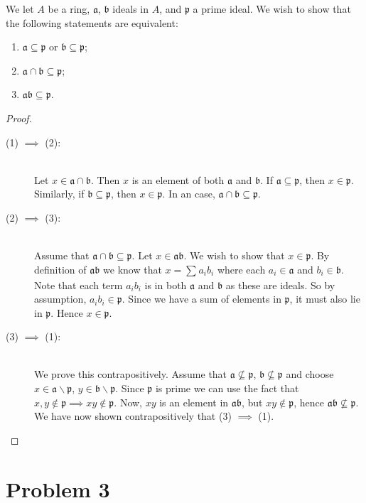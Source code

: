 \documentclass{article}
\newcommand{\p}{\mathfrak{p}}
\renewcommand{\a}{\mathfrak{a}}
\renewcommand{\b}{\mathfrak{b}}
\begin{document}
    We let $A$ be a ring, $\mathfrak{a}$, $\mathfrak{b}$ ideals in $A$, and
    $\mathfrak{p}$ a prime ideal. We wish to show that the following statements
    are equivalent:
    \begin{enumerate}[(1)]
        \item $\a \subseteq \p$ or $\b \subseteq \p$;
        \item $\a \cap \b \subseteq \p$;
        \item $\a\b \subseteq \p$.
    \end{enumerate}
    \begin{proof} 
        \hfill
        \begin{description}
            \item[(1) $\implies$ (2):]\hfill  \\
                Let $x \in \a\cap\b$.
                Then $x$ is an element of both $\mathfrak{a}$ and
                $\b$. If $\a \subseteq \p$, then
                $x \in \p$. Similarly, if $\b \subseteq
                \p$, then $x \in \p$. In an case,
                $\a\cap\b \subseteq \p$.
            \item[(2) $\implies$ (3):]\hfill \\
                Assume that $\a \cap \b \subseteq \p$. Let $x \in \a\b$. We
                wish to show that $x \in \p$. By definition of $\a\b$ we know
                that $x = \sum^{}_{} a_ib_i$ where each $a_i \in \a$ and $b_i
                \in \b$. Note that each term $a_ib_i$ is in both $\a$ and $\b$
                as these are ideals. So by assumption, $a_ib_i \in \p$. Since
                we have a sum of elements in $\p$, it must also lie in $\p$.
                Hence $x \in \p$.
            \item[(3) $\implies$ (1):]\hfill \\
                We prove this contrapositively. Assume that $\a \not\subseteq
                \p$, $\b \not\subseteq \p$ and choose $x \in \a \smallsetminus
                \p$, $y \in \b \smallsetminus \p$. Since $\p$ is prime we can
                use the fact that $x, y \notin \p \implies xy \notin \p$. Now,
                $xy$ is an element in $\a\b$, but $xy \notin \p$, hence $\a\b
                \not\subseteq \p$. We have now shown contrapositively that (3)
                $\implies$ (1).
        \end{description}
    \end{proof}
    
    \section*{Problem 3}
    \label{sec:problem_3}
     
\end{document}
